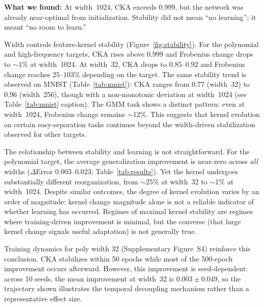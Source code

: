 \documentclass[10pt]{article}
\begin{document}
\noindent\textbf{What we found:} At width~1024, CKA exceeds $0.999$, but the network was already near-optimal from initialization. Stability did not mean ``no learning''; it meant ``no room to learn.''

Width controls feature-kernel stability (Figure~\ref{fig:stability}).  For the polynomial and high-frequency targets, CKA rises above $0.999$ and Frobenius change drops to $\sim$1\% at width~1024.  At width~32, CKA drops to $0.85$--$0.92$ and Frobenius change reaches $25$--$103\%$ depending on the target.  The same stability trend is observed on MNIST (Table~\ref{tab:mnist}): CKA ranges from $0.77$ (width~32) to $0.96$ (width~256), though with a non-monotonic deviation at width~1024 (see Table~\ref{tab:mnist} caption).  The GMM task shows a distinct pattern: even at width~1024, Frobenius change remains $\sim$12\%. This suggests that kernel evolution on certain easy-separation tasks continues beyond the width-driven stabilization observed for other targets.

The relationship between stability and learning is not straightforward.  For the polynomial target, the average generalization improvement is near-zero across \emph{all} widths ($\Delta$Error $0.003$--$0.023$; Table~\ref{tab:results}). Yet the kernel undergoes substantially different reorganization, from $\sim$25\% at width~32 to $\sim$1\% at width~1024.  Despite similar outcomes, the degree of kernel evolution varies by an order of magnitude: kernel change magnitude alone is not a reliable indicator of whether learning has occurred.  Regimes of maximal kernel stability are regimes where training-driven improvement is minimal, but the converse (that large kernel change signals useful adaptation) is not generally true.

Training dynamics for poly width 32 (Supplementary Figure~S4) reinforce this conclusion. CKA stabilizes within 50 epochs while most of the 500-epoch improvement occurs afterward. However, this improvement is seed-dependent: across 10 seeds, the mean improvement at width~32 is $0.003\pm0.049$, so the trajectory shown illustrates the temporal decoupling mechanism rather than a representative effect size.
\end{document}
